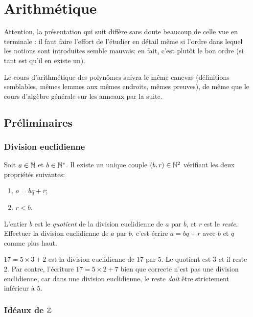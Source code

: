 \chapter{Arithmétique}
\minitoc
\hyperlink{toc}{\retourTOC}

Attention, la présentation qui suit diffère sans doute beaucoup de celle vue en terminale : il faut faire l'effort de l'étudier en détail même si l'ordre dans lequel les notions sont introduites semble \og mauvais\fg : en fait, c'est plutôt le \og bon\fg{} ordre (si tant est qu'il en existe un).

Le cours d'arithmétique des polynômes suivra le même canevas (définitions semblables, mêmes lemmes aux mêmes endroits, mêmes preuves), de même que le cours d'algèbre générale sur les anneaux par la suite.

\section{Préliminaires}

\subsection{Division euclidienne}
\begin{proposition}
Soit $a\in \mathbb{N}$ et $b\in \mathbb{N}^*$. Il existe un unique couple $(b,r) \in \mathbb{N}^2$ vérifiant les deux propriétés suivantes:
\begin{enumerate}
\item $a=bq+r$;
\item $r < b$.
\end{enumerate}
L'entier $b$ est le \emph{quotient} de la division euclidienne de $a$ par $b$, et $r$ est le \emph{reste}.
Effectuer la division euclidienne de $a$ par $b$, c'est écrire $a = bq+r$ avec $b$ et $q$ comme plus haut.
\end{proposition}

\begin{exemple}
$17=5\times 3 + 2$ est la division euclidienne de $17$ par $5$. Le quotient est $3$ et il reste $2$. Par contre, l'écriture $17=5\times 2+7$ bien que correcte  n'est pas une division euclidienne, car dans une division euclidienne, le reste \emph{doit} être strictement inférieur à $5$.
\end{exemple}

\subsection{Idéaux de $\mathbb{Z}$}

